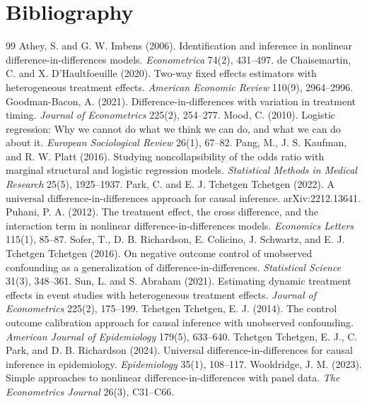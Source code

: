 \documentclass[11pt]{article}
\theoremstyle{definition}
\theoremstyle{plain}
\theoremstyle{remark}
\begin{document}
\section*{Bibliography}
\begin{thebibliography}{99}
 Athey, S. and G. W. Imbens (2006). Identification and inference in nonlinear difference-in-differences models. \emph{Econometrica} 74(2), 431--497.
 de Chaisemartin, C. and X. D'Haultfoeuille (2020). Two-way fixed effects estimators with heterogeneous treatment effects. \emph{American Economic Review} 110(9), 2964--2996.
 Goodman-Bacon, A. (2021). Difference-in-differences with variation in treatment timing. \emph{Journal of Econometrics} 225(2), 254--277.
 Mood, C. (2010). Logistic regression: Why we cannot do what we think we can do, and what we can do about it. \emph{European Sociological Review} 26(1), 67--82.
 Pang, M., J. S. Kaufman, and R. W. Platt (2016). Studying noncollapsibility of the odds ratio with marginal structural and logistic regression models. \emph{Statistical Methods in Medical Research} 25(5), 1925--1937.
 Park, C. and E. J. Tchetgen Tchetgen (2022). A universal difference-in-differences approach for causal inference. arXiv:2212.13641.
 Puhani, P. A. (2012). The treatment effect, the cross difference, and the interaction term in nonlinear difference-in-differences models. \emph{Economics Letters} 115(1), 85--87.
 Sofer, T., D. B. Richardson, E. Colicino, J. Schwartz, and E. J. Tchetgen Tchetgen (2016). On negative outcome control of unobserved confounding as a generalization of difference-in-differences. \emph{Statistical Science} 31(3), 348--361.
 Sun, L. and S. Abraham (2021). Estimating dynamic treatment effects in event studies with heterogeneous treatment effects. \emph{Journal of Econometrics} 225(2), 175--199.
 Tchetgen Tchetgen, E. J. (2014). The control outcome calibration approach for causal inference with unobserved confounding. \emph{American Journal of Epidemiology} 179(5), 633--640.
 Tchetgen Tchetgen, E. J., C. Park, and D. B. Richardson (2024). Universal difference-in-differences for causal inference in epidemiology. \emph{Epidemiology} 35(1), 108--117.
 Wooldridge, J. M. (2023). Simple approaches to nonlinear difference-in-differences with panel data. \emph{The Econometrics Journal} 26(3), C31--C66.
\end{thebibliography}
\end{document}
